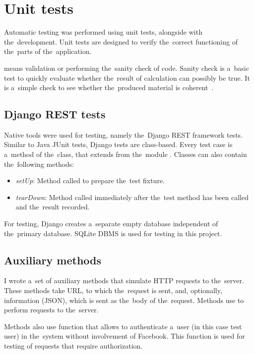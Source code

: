 \section{Unit tests}
Automatic testing was performed using unit tests, alongside with the~development. Unit tests are designed to verify
the~correct functioning of the~parts of the~application.

 means validation or performing the~sanity check of code. Sanity check is a~basic test to
quickly evaluate whether the~result of calculation can possibly be true. It is a~simple check to see whether
the~produced material is coherent~\cite{unittesting}.

\subsection{Django REST tests}
Native tools were used for testing, namely the~Django REST framework tests. Similar to Java JUnit tests, Django tests
are class-based. Every test case is a~method of the~class, that extends  from the~module
. Classes can also contain the~following methods:

\begin{itemize}
\item{\textit{setUp}}: Method called to prepare the~test fixture.
\item{\textit{tearDown}}: Method called immediately after the~test method has been called and the~result recorded.
\end{itemize}

For testing, Django creates a~separate empty database independent of the~primary database. SQLite \ac{DBMS} is used for
testing in this project.

\subsection{Auxiliary methods}
I wrote a~set of auxiliary methods that simulate \ac{HTTP} requests to the~server. These methods take \ac{URL}, to which
the~request is sent, and, optionally, infor\-mation (\ac{JSON}), which is sent as the~body of the~request. Methods use
 to perform requests to the~server.

Methods also use  function that allows to authenticate a~user (in this case test user) in
the~system without involvement of Facebook. This function is used for testing of requests that require authorization.


